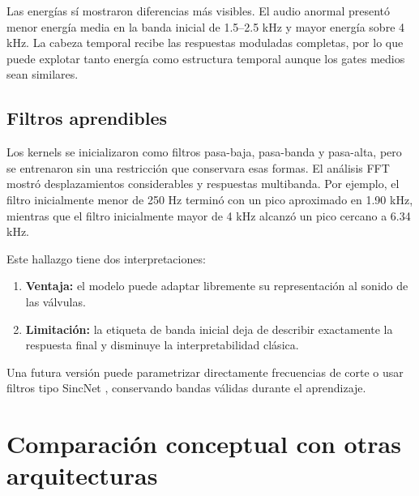 \documentclass[11pt,a4paper]{article}
\begin{document}
Las energías sí mostraron diferencias más visibles. El audio anormal presentó
menor energía media en la banda inicial de 1.5--2.5 kHz y mayor energía sobre
4 kHz. La cabeza temporal recibe las respuestas moduladas completas, por lo que
puede explotar tanto energía como estructura temporal aunque los gates medios
sean similares.

\subsection{Filtros aprendibles}

Los kernels se inicializaron como filtros pasa-baja, pasa-banda y pasa-alta,
pero se entrenaron sin una restricción que conservara esas formas. El análisis
FFT mostró desplazamientos considerables y respuestas multibanda. Por ejemplo,
el filtro inicialmente menor de 250 Hz terminó con un pico aproximado en
1.90 kHz, mientras que el filtro inicialmente mayor de 4 kHz alcanzó un pico
cercano a 6.34 kHz.

Este hallazgo tiene dos interpretaciones:

\begin{enumerate}
  \item \textbf{Ventaja:} el modelo puede adaptar libremente su representación
  al sonido de las válvulas.
  \item \textbf{Limitación:} la etiqueta de banda inicial deja de describir
  exactamente la respuesta final y disminuye la interpretabilidad clásica.
\end{enumerate}

Una futura versión puede parametrizar directamente frecuencias de corte o usar
filtros tipo SincNet \cite{ravanelli2018sincnet}, conservando bandas válidas
durante el aprendizaje.

\section{Comparación conceptual con otras arquitecturas}
\end{document}
